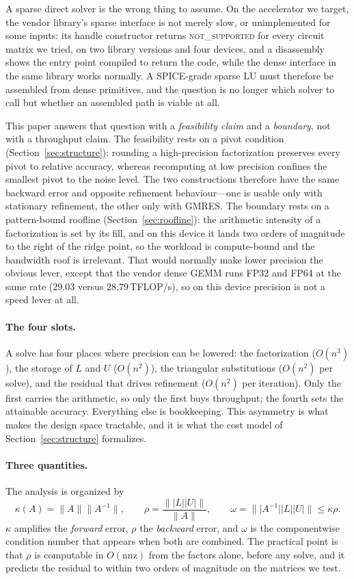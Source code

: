 \documentclass[11pt]{article}
\theoremstyle{remark}
\newcommand{\norm}[1]{\lVert #1 \rVert}
\newcommand{\abs}[1]{\lvert #1 \rvert}
\begin{document}
A sparse direct solver is the wrong thing to assume. On the accelerator we
target, the vendor library's sparse interface is not merely slow, or unimplemented
for some inputs: its handle constructor returns \textsc{not\_supported} for every
circuit matrix we tried, on two library versions and four devices, and a
disassembly shows the entry point compiled to return the code, while the dense
interface in the same library works normally. A SPICE-grade sparse LU must
therefore be assembled from dense primitives, and the question is no longer which
solver to call but whether an assembled path is viable at all.

This paper answers that question with a \emph{feasibility claim} and a
\emph{boundary}, not with a throughput claim. The feasibility rests on a pivot
condition (Section~\ref{sec:structure}): rounding a high-precision factorization
preserves every pivot to relative accuracy, whereas recomputing at low precision
confines the smallest pivot to the noise level. The two constructions therefore
have the same backward error and opposite refinement behaviour---one is usable
only with stationary refinement, the other only with GMRES. The boundary rests on
a pattern-bound roofline (Section~\ref{sec:roofline}): the arithmetic intensity of
a factorization is set by its fill, and on this device it lands two orders of
magnitude to the right of the ridge point, so the workload is compute-bound and
the bandwidth roof is irrelevant. That would normally make lower precision the
obvious lever, except that the vendor dense GEMM runs FP32 and FP64 at the same
rate ($29.03$ versus $28.79$\,TFLOP/s), so on this device precision is not a speed
lever at all.

\paragraph{The four slots.}
A solve has four places where precision can be lowered: the factorization
($O(n^3)$), the storage of $L$ and $U$ ($O(n^2)$), the triangular substitutions
($O(n^2)$ per solve), and the residual that drives refinement ($O(n^2)$ per
iteration). Only the first carries the arithmetic, so only the first buys
throughput; the fourth sets the attainable accuracy. Everything else is
bookkeeping. This asymmetry is what makes the design space tractable, and it is
what the cost model of Section~\ref{sec:structure} formalizes.

\paragraph{Three quantities.}
The analysis is organized by
\[
  \kappa(A)=\norm{A}\norm{A^{-1}},\qquad
  \rho=\frac{\norm{\abs{L}\abs{U}}}{\norm{A}},\qquad
  \omega=\norm{\abs{A^{-1}}\abs{L}\abs{U}}\le\kappa\rho .
\]
$\kappa$ amplifies the \emph{forward} error, $\rho$ the \emph{backward} error, and
$\omega$ is the componentwise condition number that appears when both are
combined. The practical point is that $\rho$ is computable in $O(\mathrm{nnz})$
from the factors alone, before any solve, and it predicts the residual to within
two orders of magnitude on the matrices we test.
\end{document}
